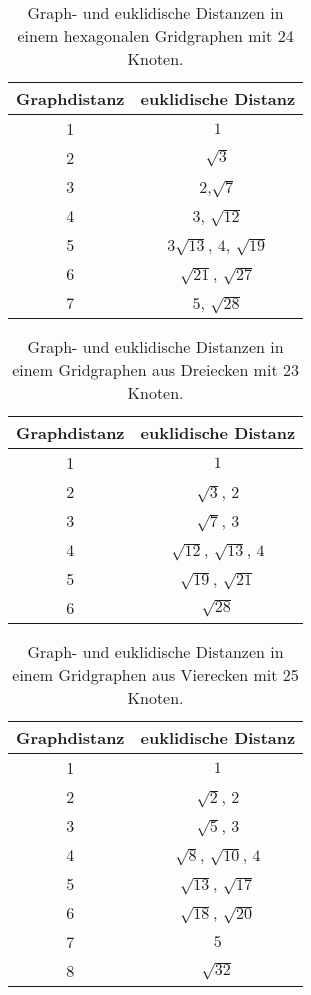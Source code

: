 \documentclass[
	fontsize=12pt,
	paper=a4,
	twoside=false,
	numbers=noenddot,
	plainheadsepline,
	toc=listof,
	toc=bibliography
]{scrartcl}
\begin{document}
\begin{table}[tb]
\centering
  \begin{tabular}{|c|c|}
  \hline
   Graphdistanz	& euklidische Distanz \\ \hline
		1	& $1$\\
		2	& $\sqrt{3}$\\
		3	& $2$,$\sqrt{7}$\\
		4	& $3$, $\sqrt{12}$\\
		5	& $3\sqrt{13}$, $4$, $\sqrt{19}$\\
		6	& $\sqrt{21}$, $\sqrt{27}$\\
		7	& $5$, $\sqrt{28}$\\
  \hline
  \end{tabular}
\caption{Graph- und euklidische Distanzen in einem hexagonalen Gridgraphen mit 24 Knoten.}
\label{TreppFunk1}
\end{table}

\begin{table}[htbp]
\centering
  \begin{tabular}{|c|c|}
  \hline
   Graphdistanz	& euklidische Distanz \\ \hline
		1	& $1$\\
		2	& $\sqrt{3}$, $2$\\
		3	& $\sqrt{7}$, $3$\\
		4	& $\sqrt{12}$, $\sqrt{13}$, $4$\\
		5	& $\sqrt{19}$, $\sqrt{21}$\\
		6	& $\sqrt{28}$\\
  \hline
  \end{tabular}
\caption{Graph- und euklidische Distanzen in einem Gridgraphen aus Dreiecken mit 23 Knoten.}
\label{TreppFunk2}
\end{table}

\begin{table}[htbp]
\centering
  \begin{tabular}{|c|c|}
  \hline
   Graphdistanz	& euklidische Distanz \\ \hline
		1	& $1$\\
		2	& $\sqrt{2}$, $2$\\
		3	& $\sqrt{5}$, $3$\\
		4	& $\sqrt{8}$, $\sqrt{10}$, $4$\\
		5	& $\sqrt{13}$, $\sqrt{17}$\\
		6	& $\sqrt{18}$, $\sqrt{20}$\\
		7	& $5$\\
		8	& $\sqrt{32}$\\
  \hline
  \end{tabular}
\caption{Graph- und euklidische Distanzen in einem Gridgraphen aus Vierecken mit 25 Knoten.}
\label{TreppFunk3}
\end{table}
\end{document}
